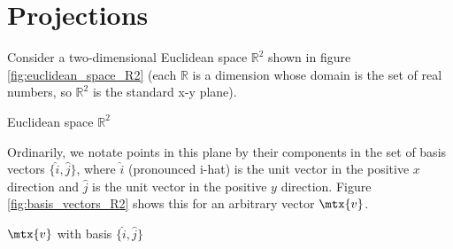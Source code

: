 \section{Projections}

Consider a two-dimensional Euclidean space $\mathbb{R}^2$ shown in figure
\ref{fig:euclidean_space_R2} (each $\mathbb{R}$ is a dimension whose domain is
the set of real numbers, so $\mathbb{R}^2$ is the standard x-y plane).

\begin{bookfigure}

  \caption{Euclidean space $\mathbb{R}^2$}
  \label{fig:euclidean_space_R2}
\end{bookfigure}

Ordinarily, we notate points in this plane by their components in the set of
basis vectors $\{\hat{i}, \hat{j}\}$, where $\hat{i}$ (pronounced i-hat) is the
unit vector in the positive $x$ direction and $\hat{j}$ is the unit vector in
the positive $y$ direction. Figure \ref{fig:basis_vectors_R2} shows this for an
arbitrary vector $\mtx{v}$.

\begin{bookfigure}

  \caption{$\mtx{v}$ with basis $\{\hat{i}, \hat{j}\}$}
  \label{fig:basis_vectors_R2}
\end{bookfigure}

